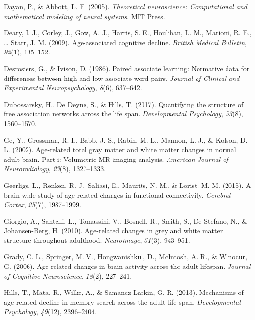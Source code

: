 \documentclass[
  man]{apa6}
\newlength{\cslhangindent}
\newlength{\cslentryspacingunit} %
\newenvironment{CSLReferences}[2] %
 {%
  \setlength{\parindent}{0pt}
  \ifodd #1
  \let\oldpar\par
  \def\par{\hangindent=\cslhangindent\oldpar}
  \fi
  \setlength{\parskip}{#2\cslentryspacingunit}
 }%
 {}
\begin{document}
\begin{CSLReferences}{1}{0}
\leavevmode{}%
Dayan, P., \& Abbott, L. F. (2005). \emph{Theoretical neuroscience: Computational and mathematical modeling of neural systems}. MIT Press.

\leavevmode{}%
Deary, I. J., Corley, J., Gow, A. J., Harris, S. E., Houlihan, L. M., Marioni, R. E., \ldots{} Starr, J. M. (2009). Age-associated cognitive decline. \emph{British Medical Bulletin}, \emph{92}(1), 135--152.

\leavevmode{}%
Desrosiers, G., \& Ivison, D. (1986). Paired associate learning: Normative data for differences between high and low associate word pairs. \emph{Journal of Clinical and Experimental Neuropsychology}, \emph{8}(6), 637--642.

\leavevmode{}%
Dubossarsky, H., De Deyne, S., \& Hills, T. (2017). Quantifying the structure of free association networks across the life span. \emph{Developmental Psychology}, \emph{53}(8), 1560--1570.

\leavevmode{}%
Ge, Y., Grossman, R. I., Babb, J. S., Rabin, M. L., Mannon, L. J., \& Kolson, D. L. (2002). Age-related total gray matter and white matter changes in normal adult brain. Part i: Volumetric MR imaging analysis. \emph{American Journal of Neuroradiology}, \emph{23}(8), 1327--1333.

\leavevmode{}%
Geerligs, L., Renken, R. J., Saliasi, E., Maurits, N. M., \& Lorist, M. M. (2015). A brain-wide study of age-related changes in functional connectivity. \emph{Cerebral Cortex}, \emph{25}(7), 1987--1999.

\leavevmode{}%
Giorgio, A., Santelli, L., Tomassini, V., Bosnell, R., Smith, S., De Stefano, N., \& Johansen-Berg, H. (2010). Age-related changes in grey and white matter structure throughout adulthood. \emph{Neuroimage}, \emph{51}(3), 943--951.

\leavevmode{}%
Grady, C. L., Springer, M. V., Hongwanishkul, D., McIntosh, A. R., \& Winocur, G. (2006). Age-related changes in brain activity across the adult lifespan. \emph{Journal of Cognitive Neuroscience}, \emph{18}(2), 227--241.

\leavevmode{}%
Hills, T., Mata, R., Wilke, A., \& Samanez-Larkin, G. R. (2013). Mechanisms of age-related decline in memory search across the adult life span. \emph{Developmental Psychology}, \emph{49}(12), 2396--2404.


\end{CSLReferences}
\end{document}
